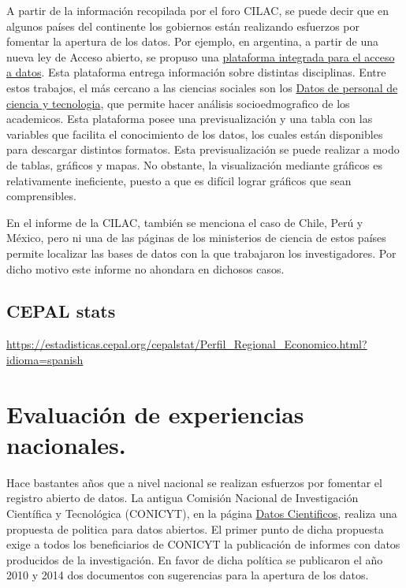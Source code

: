 \documentclass[
  14pt,
]{book}
\begin{document}
A partir de la información recopilada por el foro CILAC, se puede decir que en algunos países del continente los gobiernos están realizando esfuerzos por fomentar la apertura de los datos. Por ejemplo, en argentina, a partir de una nueva ley de Acceso abierto, se propuso una \href{http://datos.mincyt.gob.ar/}{plataforma integrada para el acceso a datos}. Esta plataforma entrega información sobre distintas disciplinas. Entre estos trabajos, el más cercano a las ciencias sociales son los \href{https://datasets.datos.mincyt.gob.ar/dataset/personal-de-ciencia-y-tecnologia/archivo/11dca5bb-9a5f-4da5-b040-28957126be18}{Datos de personal de ciencia y tecnologia}, que permite hacer análisis socioedmografico de los academicos. Esta plataforma posee una previsualización y una tabla con las variables que facilita el conocimiento de los datos, los cuales están disponibles para descargar distintos formatos. Esta previsualización se puede realizar a modo de tablas, gráficos y mapas. No obstante, la visualización mediante gráficos es relativamente ineficiente, puesto a que es difícil lograr gráficos que sean comprensibles.

En el informe de la CILAC, también se menciona el caso de Chile, Perú y México, pero ni una de las páginas de los ministerios de ciencia de estos países permite localizar las bases de datos con la que trabajaron los investigadores. Por dicho motivo este informe no ahondara en dichosos casos.

\hypertarget{cepal-stats}{%
\subsection{CEPAL stats}\label{cepal-stats}}

\url{https://estadisticas.cepal.org/cepalstat/Perfil_Regional_Economico.html?idioma=spanish}

\hypertarget{evaluaciuxf3n-de-experiencias-nacionales.}{%
\section{Evaluación de experiencias nacionales.}\label{evaluaciuxf3n-de-experiencias-nacionales.}}

Hace bastantes años que a nivel nacional se realizan esfuerzos por fomentar el registro abierto de datos. La antigua Comisión Nacional de Investigación Científica y Tecnológica (CONICYT), en la página \href{http://datoscientificos.cl/}{Datos Cientificos}\citep{programadeinformacioncientifica_Ciencia_2019}, realiza una propuesta de politica para datos abiertos. El primer punto de dicha propuesta exige a todos los beneficiarios de CONICYT la publicación de informes con datos producidos de la investigación. En favor de dicha política se publicaron el año 2010 y 2014 dos documentos con sugerencias para la apertura de los datos.
\end{document}
